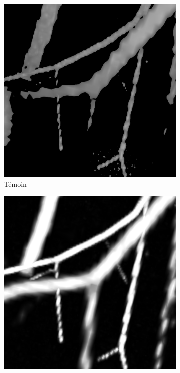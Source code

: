\begin{figure}[!ht]
\begin{subfigure}[t]{0.30\textwidth}
      \includegraphics[clip = true, trim  =  170 230 150 240, width=\textwidth]{Images/Vascu_2_k_Baseline.png}
      \caption{Témoin}
    \end{subfigure}
    \begin{subfigure}[t]{0.30\textwidth}
      \includegraphics[clip = true, trim  =  170 230 150 240, width=\textwidth]{Images/Vascu_2_k_Frangi.png}

\end{subfigure}
\end{figure}

